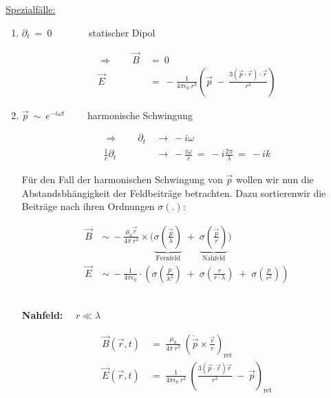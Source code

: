 \ \\
\ \\
\underline{Spezialfälle:}
\begin{enumerate}[label=\roman*)]
\item $\partial_t  \ = \ 0 \quad\ \; \qquad$ statischer Dipol

\begin{align*}
\Rightarrow \qquad \vec{B}  \ &= \ 0\\
\vec{E} \ &= \ - \frac{1}{4\pi\epsilon_0 \ r^3}\left(\vec{p} \ - \ \frac{3(\vec{p}\cdot\vec{r})\cdot\vec{r}}{r^2}\right)
\end{align*}

\item $\vec{p} \ \sim \ e^{-i\omega t} \qquad$ harmonische Schwingung

\begin{align*}
\Rightarrow \qquad \partial_t \ &\rightarrow \ -i\omega\\
\frac{1}{c}\partial_t \ &\rightarrow \ - \frac{i\omega}{c}  \ = \ -i \frac{2\pi}{\lambda}  \ = \ -ik
\end{align*}

Für den Fall der harmonischen Schwingung von $\vec{p}$ wollen wir nun die Abstandsbhängigkeit der Feldbeiträge betrachten. Dazu \grqq sortieren\grqq   wir die Beiträge nach ihren Ordnungen $\sigma(.)$:

\begin{align*}
\vec{B} \ &\sim \ - \frac{\mu_0 \vec{r}}{4\pi \ r^2} \times \Bigg(\underbrace{\sigma\left(\frac{\dot{\vec{p}}}{\lambda}\right)}_{\text{Fernfeld}} \; + \; \underbrace{\sigma\left(\frac{\dot{\vec{p}}}{r}\right)}_{\text{Nahfeld}}\Bigg)\\
\vec{E} \ &\sim \ - \frac{1}{4\pi\epsilon_0} \cdot \left(\sigma\left(\frac{p}{\lambda^2}\right) \; + \; \sigma\left(\frac{r}{r \cdot \lambda}\right) \; + \; \sigma\left(\frac{p}{r^2}\right)\right)
\end{align*}

\ \\
\textbf{Nahfeld:} $\quad r \ll \lambda$

\begin{align*}
\vec{B}(\vec{r},t)  \ &= \ \frac{\mu_0}{4\pi\ r^2} \ \left(\dot{\vec{p}} \times \frac{\vec{r}}{r}\right)_{\text{ret}}\\
\vec{E}(\vec{r},t)  \ &= \ \frac{1}{4\pi\epsilon_0 \ r^2} \ \left(\frac{3(\vec{p}\cdot\vec{r})\vec{r}}{r^2} \ - \ \vec{p}\right)_{\text{ret}} 
\end{align*}


\end{enumerate}
